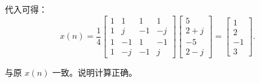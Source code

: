\documentclass[a4paper,UTF8]{article}
\numberwithin{equation}{section}
\begin{document}
\begin{framed}
   	代入可得：
   	\[
   	x(n) =
   	\frac{1}{4}
   	\begin{bmatrix}
   		1 & 1 & 1 & 1 \\
   		1 & j & -1 & -j \\
   		1 & -1 & 1 & -1 \\
   		1 & -j & -1 & j
   	\end{bmatrix}
   	\begin{bmatrix}
   		5 \\ 2 + j \\ -5 \\ 2 - j
   	\end{bmatrix}
   	=
   	\begin{bmatrix}
   		1 \\ 2 \\ -1 \\ 3
   	\end{bmatrix}.
   	\]
   	
   	与原 $x(n)$ 一致。说明计算正确。
\end{framed}
\end{document}
